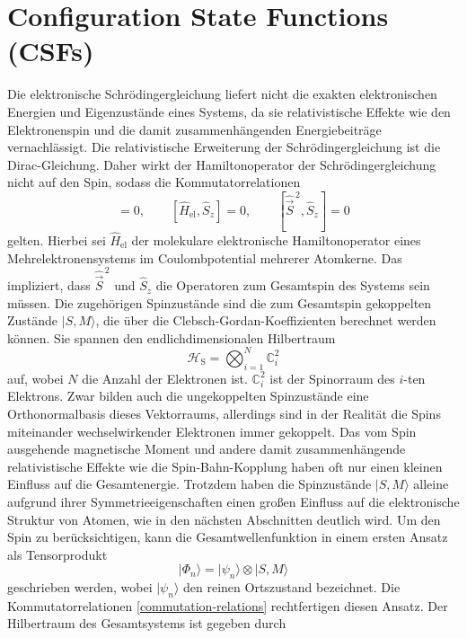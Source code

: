 \documentclass[9pt]{report}
\begin{document}
\section{Configuration State Functions (CSFs)}
Die elektronische Schrödingergleichung liefert nicht die exakten elektronischen Energien und Eigenzustände eines Systems, da sie relativistische Effekte wie den Elektronenspin und die damit zusammenhängenden Energiebeiträge vernachlässigt. Die relativistische Erweiterung der Schrödingergleichung ist die Dirac-Gleichung. Daher wirkt der Hamiltonoperator der Schrödingergleichung nicht auf den Spin, sodass die Kommutatorrelationen
\begin{equation}
[\hat{H}_{\mathrm{el}},\hat{\vec{S}}^{\,2}]=0,\qquad[\hat{H}_{\mathrm{el}},\hat{S}_{z}]=0,\qquad[\hat{\vec{S}}^{\,2},\hat{S}_{z}]=0\label{commutation-relations}
\end{equation}
gelten. Hierbei sei $\hat{H}_{\mathrm{el}}$ der molekulare elektronische Hamiltonoperator eines Mehrelektronensystems im Coulombpotential mehrerer Atomkerne. Das impliziert, dass $\hat{\vec{S}}^{\,2}$ und $\hat{S}_{z}$ die Operatoren zum Gesamtspin des Systems sein müssen. Die zugehörigen Spinzustände sind die zum Gesamtspin gekoppelten Zustände $|S,M\rangle$, die über die Clebsch-Gordan-Koeffizienten berechnet werden können. Sie spannen den endlichdimensionalen Hilbertraum
\begin{equation}
\mathcal{H}_{\mathrm{S}}=\bigotimes_{i=1}^{N}\mathbb{C}_{i}^{2}
\end{equation}
auf, wobei $N$ die Anzahl der Elektronen ist. $\mathbb{C}_{i}^{2}$ ist der Spinorraum des $i$-ten Elektrons. Zwar bilden auch die ungekoppelten Spinzustände eine Orthonormalbasis dieses Vektorraums, allerdings sind in der Realität die Spins miteinander wechselwirkender Elektronen immer gekoppelt. Das vom Spin ausgehende magnetische Moment und andere damit zusammenhängende relativistische Effekte wie die Spin-Bahn-Kopplung haben oft nur einen kleinen Einfluss auf die Gesamtenergie. Trotzdem haben die Spinzustände $|S,M\rangle$ alleine aufgrund ihrer Symmetrieeigenschaften einen großen Einfluss auf die elektronische Struktur von Atomen, wie in den nächsten Abschnitten deutlich wird. Um den Spin zu berücksichtigen, kann die Gesamtwellenfunktion in einem ersten Ansatz als Tensorprodukt
\begin{equation}
|\Phi_n\rangle = |\psi_n\rangle\otimes|S,M\rangle\label{Gesamtwellenfunktion}
\end{equation}
geschrieben werden, wobei $|\psi_n\rangle$ den reinen Ortszustand bezeichnet. Die Kommutatorrelationen \eqref{commutation-relations} rechtfertigen diesen Ansatz. Der Hilbertraum des Gesamtsystems ist gegeben durch
\end{document}
